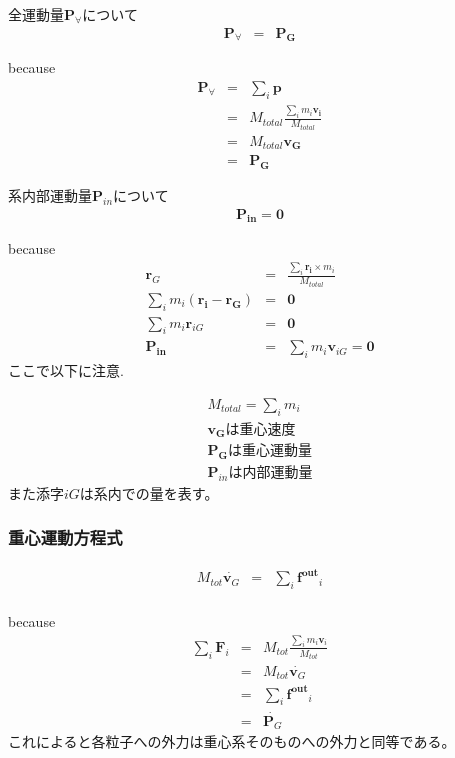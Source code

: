 \documentclass[dvipdfmx]{jsarticle}
\begin{document}
\begin{theo}
全運動量$ \bm{P}_{\forall} $について
\begin{eqnarray*}
\bm{P}_{\forall} &=& \bm{P_G}
\end{eqnarray*}
\end{theo}
because
\begin{eqnarray*}
\bm{P}_{\forall} &=& \sum_i \bm{p} \\
&=& M_{total} \frac{\sum_i m_i \bm{v_i}}{M_{total}} \\
&=& M_{total} \bm{v_G} \\
&=& \bm{P_G}
\end{eqnarray*}

\begin{theo}
系内部運動量$\bm{P}_{in}$について
\begin{eqnarray*}
\bm{P_{in}} = \bm{0}
\end{eqnarray*}
\end{theo}
because
\begin{eqnarray*}
\bm{r}_G &=& \frac{\sum_i \bm{r_i} \times m_i}{M_{total}} \\
\sum_i m_i(\bm{r_i} - \bm{r_G}) &=& \bm{0} \\
\sum_i m_i\bm{r}_{iG} &=& \bm{0} \\
\bm{P_{in}} &=& \sum_i m_i \bm{v}_{iG} =\bm{0}
\end{eqnarray*}
ここで以下に注意.

\begin{eqnarray*}
M_{total} = \sum_i m_i \\
\bm{v_G} は重心速度 \\
\bm{P_G} は重心運動量 \\
\bm{P}_{in}　は内部運動量
\end{eqnarray*}
また添字$iG$は系内での量を表す。

\subsubsection{重心運動方程式}
\begin{theo}
\begin{eqnarray*}
M_{tot} \dot{\bm{v}_G} &=& \sum_i \bm{f^{out}}_i \\
\end{eqnarray*}
\end{theo}
because 
\begin{eqnarray*}
\sum_i \bm{F}_i &=& M_{tot} \frac{\sum_i m_i \bm{v}_i}{M_{tot}} \\
 &=& M_{tot} \dot{\bm{v}_G} \\
 &=& \sum_i \bm{f^{out}}_i \\
 &=& \dot{\bm{P}_G}
\end{eqnarray*}
これによると各粒子への外力は重心系そのものへの外力と同等である。
\end{document}
